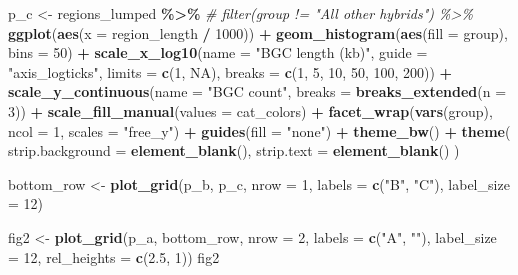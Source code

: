 \documentclass[
]{article}
\newenvironment{Shaded}{\begin{snugshade}}{\end{snugshade}}
\newcommand{\AttributeTok}[1]{\textcolor[rgb]{0.13,0.29,0.53}{#1}}
\newcommand{\CommentTok}[1]{\textcolor[rgb]{0.56,0.35,0.01}{\textit{#1}}}
\newcommand{\ConstantTok}[1]{\textcolor[rgb]{0.56,0.35,0.01}{#1}}
\newcommand{\DecValTok}[1]{\textcolor[rgb]{0.00,0.00,0.81}{#1}}
\newcommand{\FloatTok}[1]{\textcolor[rgb]{0.00,0.00,0.81}{#1}}
\newcommand{\FunctionTok}[1]{\textcolor[rgb]{0.13,0.29,0.53}{\textbf{#1}}}
\newcommand{\NormalTok}[1]{#1}
\newcommand{\OtherTok}[1]{\textcolor[rgb]{0.56,0.35,0.01}{#1}}
\newcommand{\SpecialCharTok}[1]{\textcolor[rgb]{0.81,0.36,0.00}{\textbf{#1}}}
\newcommand{\StringTok}[1]{\textcolor[rgb]{0.31,0.60,0.02}{#1}}
\begin{document}
\begin{Shaded}
\begin{Highlighting}[]
\NormalTok{p\_c }\OtherTok{\textless{}{-}}\NormalTok{ regions\_lumped }\SpecialCharTok{\%\textgreater{}\%}
  \CommentTok{\# filter(group != "All other hybrids") \%\textgreater{}\%}
  \FunctionTok{ggplot}\NormalTok{(}\FunctionTok{aes}\NormalTok{(}\AttributeTok{x =}\NormalTok{ region\_length }\SpecialCharTok{/} \DecValTok{1000}\NormalTok{)) }\SpecialCharTok{+}
      \FunctionTok{geom\_histogram}\NormalTok{(}\FunctionTok{aes}\NormalTok{(}\AttributeTok{fill =}\NormalTok{ group), }\AttributeTok{bins =} \DecValTok{50}\NormalTok{) }\SpecialCharTok{+}
      \FunctionTok{scale\_x\_log10}\NormalTok{(}\AttributeTok{name =} \StringTok{"BGC length (kb)"}\NormalTok{, }\AttributeTok{guide =} \StringTok{"axis\_logticks"}\NormalTok{, }\AttributeTok{limits =} \FunctionTok{c}\NormalTok{(}\DecValTok{1}\NormalTok{, }\ConstantTok{NA}\NormalTok{), }\AttributeTok{breaks =} \FunctionTok{c}\NormalTok{(}\DecValTok{1}\NormalTok{, }\DecValTok{5}\NormalTok{, }\DecValTok{10}\NormalTok{, }\DecValTok{50}\NormalTok{, }\DecValTok{100}\NormalTok{, }\DecValTok{200}\NormalTok{)) }\SpecialCharTok{+}
      \FunctionTok{scale\_y\_continuous}\NormalTok{(}\AttributeTok{name =} \StringTok{"BGC count"}\NormalTok{, }\AttributeTok{breaks =} \FunctionTok{breaks\_extended}\NormalTok{(}\AttributeTok{n =} \DecValTok{3}\NormalTok{)) }\SpecialCharTok{+}
      \FunctionTok{scale\_fill\_manual}\NormalTok{(}\AttributeTok{values =}\NormalTok{ cat\_colors) }\SpecialCharTok{+}
      \FunctionTok{facet\_wrap}\NormalTok{(}\FunctionTok{vars}\NormalTok{(group), }\AttributeTok{ncol =} \DecValTok{1}\NormalTok{, }\AttributeTok{scales =} \StringTok{"free\_y"}\NormalTok{) }\SpecialCharTok{+}
      \FunctionTok{guides}\NormalTok{(}\AttributeTok{fill =} \StringTok{"none"}\NormalTok{) }\SpecialCharTok{+}
      \FunctionTok{theme\_bw}\NormalTok{() }\SpecialCharTok{+}
      \FunctionTok{theme}\NormalTok{(}
        \AttributeTok{strip.background =} \FunctionTok{element\_blank}\NormalTok{(),}
        \AttributeTok{strip.text =} \FunctionTok{element\_blank}\NormalTok{()}
\NormalTok{      )}

\NormalTok{bottom\_row }\OtherTok{\textless{}{-}} \FunctionTok{plot\_grid}\NormalTok{(p\_b, p\_c, }\AttributeTok{nrow =} \DecValTok{1}\NormalTok{, }\AttributeTok{labels =} \FunctionTok{c}\NormalTok{(}\StringTok{"B"}\NormalTok{, }\StringTok{"C"}\NormalTok{), }\AttributeTok{label\_size =} \DecValTok{12}\NormalTok{)}

\NormalTok{fig2 }\OtherTok{\textless{}{-}} \FunctionTok{plot\_grid}\NormalTok{(p\_a, bottom\_row, }\AttributeTok{nrow =} \DecValTok{2}\NormalTok{, }\AttributeTok{labels =} \FunctionTok{c}\NormalTok{(}\StringTok{"A"}\NormalTok{, }\StringTok{""}\NormalTok{), }\AttributeTok{label\_size =} \DecValTok{12}\NormalTok{, }\AttributeTok{rel\_heights =} \FunctionTok{c}\NormalTok{(}\FloatTok{2.5}\NormalTok{, }\DecValTok{1}\NormalTok{))}
\NormalTok{fig2}
\end{Highlighting}
\end{Shaded}
\end{document}
